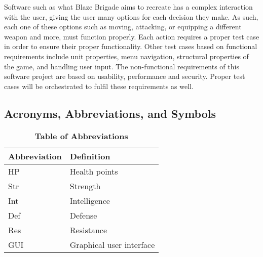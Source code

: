 \documentclass{article}
\begin{document}
Software such as what Blaze Brigade aims to recreate has a complex interaction with the user, giving the user many options for each decision they make. As such, each one of these options such as moving, attacking, or equipping a different weapon and more, must function properly. Each action requires a proper test case in order to ensure their proper functionality. Other test cases based on functional requirements include unit properties, menu navigation, structural properties of the game, and handling user input. The non-functional requirements of this software project are based on usability, performance and security. Proper test cases will be orchestrated to fulfil these requirements as well.

\subsection{Acronyms, Abbreviations, and Symbols}

\begin{table}[h]
\caption{\textbf{Table of Abbreviations}}
\begin{tabularx}{\textwidth}{lX}
    \toprule
    \textbf{Abbreviation} & \textbf{Definition} \\
    \midrule
    HP & Health points \\
    Str & Strength \\
    Int & Intelligence \\
    Def & Defense \\
    Res & Resistance \\
    GUI & Graphical user interface \\
    \bottomrule
\end{tabularx}
\end{table}
\end{document}

